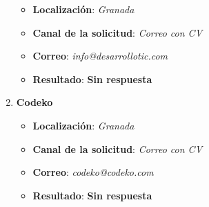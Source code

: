 \begin{enumerate}
\begin{itemize}
		\item \textbf{Localización}: \textit{Granada}
		\item \textbf{Canal de la solicitud}: \textit{Correo con CV}
		\item \textbf{Correo}: \textit{info@desarrollotic.com}
		\item \textbf{Resultado}: {\color{orange} \textbf{Sin respuesta}}
	\end{itemize}
	\item \textbf{Codeko}
	\begin{itemize}
		\item \textbf{Localización}: \textit{Granada}
		\item \textbf{Canal de la solicitud}: \textit{Correo con CV}
		\item \textbf{Correo}: \textit{codeko@codeko.com}
		\item \textbf{Resultado}: {\color{orange} \textbf{Sin respuesta}}
	\end{itemize}
\end{enumerate}







%

